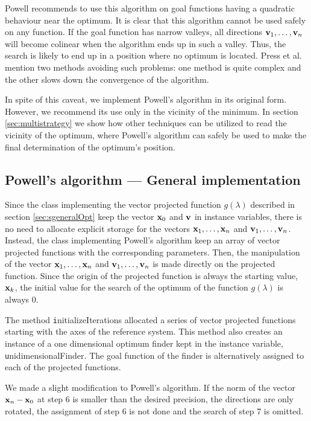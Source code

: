 Powell recommends to use this algorithm on goal functions having a
quadratic behaviour near the optimum. It is clear that this
algorithm cannot be used safely on any function. If the goal
function has narrow valleys, all directions ${\textbf v}_1,\ldots,{\textbf
v}_n$ will become colinear when the algorithm ends up in such a
valley. Thus, the search is likely to end up in a position where
no optimum is located. Press et al. \cite{Press} mention two
methods avoiding such problems: one method is quite complex and
the other slows down the convergence of the algorithm.

In spite of this {\textit caveat}, we implement Powell's algorithm in
its original form. However, we recommend its use only in the
vicinity of the minimum. In section \ref{sec:multistrategy} we
show how other techniques can be utilized to read the vicinity of
the optimum, where Powell's algorithm can safely be used to make
the final determination of the optimum's position.

\subsection{Powell's algorithm --- General implementation}
Since the class implementing the vector projected function
$g\left(\lambda\right)$ described in section
\ref{sec:sgeneralOpt} keep the vector
${\textbf x}_0$ and ${\textbf v}$ in instance variables, there is no need
to allocate explicit storage for the vectors ${\textbf
x}_1,\ldots,{\textbf x}_n$ and ${\textbf v}_1,\ldots,{\textbf v}_n$. Instead,
the class implementing Powell's algorithm keep an array of vector
projected functions with the corresponding parameters. Then, the
manipulation of the vector ${\textbf x}_1,\ldots,{\textbf x}_n$ and ${\textbf
v}_1,\ldots,{\textbf v}_n$ is made directly on the projected function.
Since the origin of the projected function is always the starting
value, ${\textbf x}_k$, the initial value for the search of the
optimum of the function $g\left(\lambda\right)$ is always 0.

The method {\texttt initializeIterations} allocated a series of vector
projected functions starting with the axes of the reference
system. This method also creates an instance of a one dimensional
optimum finder kept in the instance variable, {\texttt
unidimensionalFinder}. The goal function of the finder is
alternatively assigned to each of the projected functions.

We made a slight modification to Powell's algorithm. If the norm
of the vector ${\textbf x}_n-{\textbf x}_0$ at step 6 is smaller than the
desired precision, the directions are only rotated, the assignment
of step 6 is not done and the search of step 7 is omitted.

